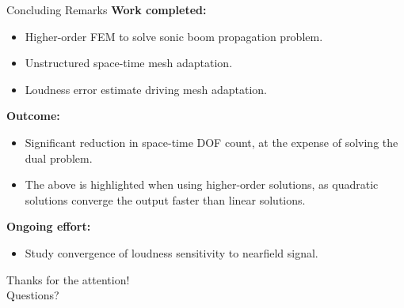 \documentclass{beamer}
\begin{document}
{
\begin{frame}[t]{Concluding Remarks}
    \textbf{Work completed:}
    \begin{itemize}
      \item Higher-order FEM to solve sonic boom propagation problem.
      \item Unstructured space-time mesh adaptation.
      \item Loudness error estimate driving mesh adaptation.
    \end{itemize}

    \textbf{Outcome:}
    \begin{itemize}
      \item Significant reduction in space-time DOF count, at the expense of solving the dual problem.
      \item The above is highlighted when using higher-order solutions, as quadratic solutions converge the output faster than linear solutions.
    \end{itemize}

    \vspace{15pt}
    \textbf{Ongoing effort:}
    \begin{itemize}
      \item Study convergence of loudness sensitivity to nearfield signal.
    \end{itemize}
\end{frame}
}


\begin{frame}[plain]
  \vfill
  \centering
  {Thanks for the attention! \\ \small Questions?}
  \vfill
\end{frame}
\end{document}
